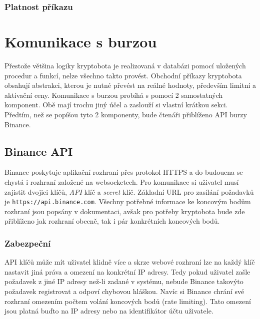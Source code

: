 \subsubsection{Platnost příkazu}

\section{Komunikace s burzou}
\label{subsec:exchanges-comm}
Přestože většina logiky kryptobota je realizovaná v databázi pomocí uložených procedur a funkcí, nelze všechno takto provést. Obchodní příkazy kryptobota obsahují abstrakci, kterou je
nutné převést na reálné hodnoty, především limitní a aktivační ceny. Komunikace s burzou probíhá s pomocí 2 samostatných komponent. Obě mají trochu jiný účel a zaslouží si vlastní krátkou sekci.
Předtím, než se popíšou tyto 2 komponenty, bude čtenáři přiblíženo API burzy Binance.

\subsection{Binance API}
Binance poskytuje aplikační rozhraní přes protokol HTTPS a do budoucna se chystá i rozhraní založené na websocketech. Pro komunikace si uživatel musí zajistit dvojici klíčů, \emph{API} klíč 
a \emph{secret} klíč.
Základní URL pro zasílání požadavků je \verb|https://api.binance.com|.
Všechny potřebné informace ke koncovým bodům rozhraní jsou popsány v dokumentaci, avšak pro potřeby kryptobota bude zde přiblíženo jak rozhraní obecně, tak i pár konkrétních koncových bodů.

\subsubsection{Zabezpeční}
API klíčů může mít uživatel klidně více a skrze webové rozhraní lze na každý klíč nastavit jiná práva a omezení na konkrétní IP adresy. Tedy pokud uživatel zašle požadavek z jiné IP adresy než-li
zadané v systému, nebude Binance takovýto požadavek registrovat a odpoví chybovou hláškou. Navíc si Binance chrání své rozhraní omezením počtem volání koncových bodů (rate limiting). Tato omezení
jsou platná buďto na IP adresy nebo na identifikátor účtu uživatele.

